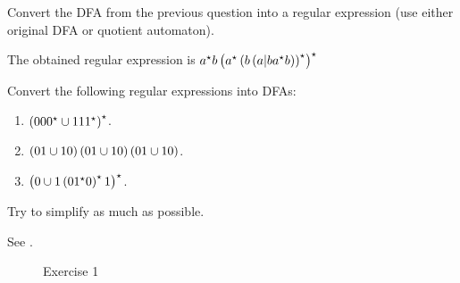 \documentclass{article}
\begin{document}
\begin{exercise}
Convert the DFA from the previous question into a regular expression (use either original DFA or quotient automaton).
\begin{answer}
The obtained regular expression is $a^{\star}b\left( a^{\star}\left( b\left( a|ba^{\star}b \right) \right)^{\star} \right)^{\star}$
\end{answer}
\end{exercise}
\begin{exercise}
Convert the following regular expressions into DFAs:
\begin{enumerate}
 \item $\left( 000^{\star}\cup 111^{\star} \right)^{\star}$.
 \item $\left( 01\cup 10 \right)\left( 01\cup 10 \right)\left( 01\cup 10 \right)$.
 \item $\left( 0\cup 1\left( 01^{\star}0 \right)^{\star}1 \right)^{\star}$.
\end{enumerate}
Try to simplify as much as possible.
\begin{answer}See .
\begin{figure}[H]
\centering
{}
\caption{Exercise 1}
\end{figure}
\end{answer}
\end{exercise}
\end{document}
